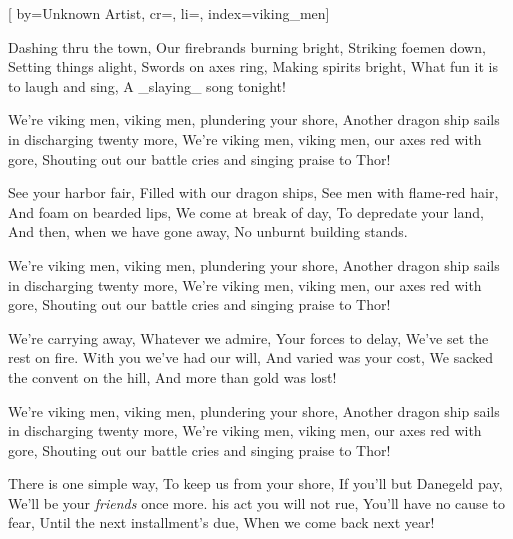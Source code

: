 
[%
    by={Unknown Artist},
    cr={},
    li={},
    index={viking_men}]


    \label{viking_men}

    \beginverse\memorize[verse]
        Dashing thru the town, Our firebrands burning bright,
        Striking foemen down, Setting things alight,
        Swords on axes ring, Making spirits bright,
        What fun it is to laugh and sing, A _slaying_ song tonight!
    \endverse

    \beginchorus\memorize[chorus]
        We're viking men, viking men, plundering your shore,
        Another dragon ship sails in discharging twenty more, We're viking men,
        viking men, our axes red with gore,
        Shouting out our battle cries and singing praise to Thor!
    \endchorus

    \beginverse\replay[verse]
        See your harbor fair, Filled with our dragon ships,
        See men with flame-red hair, And foam on bearded lips,
        We come at break of day, To depredate your land,
        And then, when we have gone away, No unburnt building stands.
    \endverse

    \beginchorus\replay[chorus]
        We're viking men, viking men, plundering your shore,
        Another dragon ship sails in discharging twenty more, We're viking men,
        viking men, our axes red with gore,
        Shouting out our battle cries and singing praise to Thor!
    \endchorus

    \beginverse\replay[verse]
        We're carrying away, Whatever we admire,
        Your forces to delay, We've set the rest on fire.
        With you we've had our will, And varied was your cost,
        We sacked the convent on the hill, And more than gold was lost!
    \endverse

    \beginchorus\replay[chorus]
        We're viking men, viking men, plundering your shore,
        Another dragon ship sails in discharging twenty more, We're viking men,
        viking men, our axes red with gore,
        Shouting out our battle cries and singing praise to Thor!
    \endchorus

    \beginverse\replay[verse]
        There is one simple way, To keep us from your shore,
        If you'll but Danegeld pay,
        We'll be your \textit{friends} once more.
        his act you will not rue, You'll have no cause to fear,
        Until the next installment's due, When we come back next year!
    \endverse

